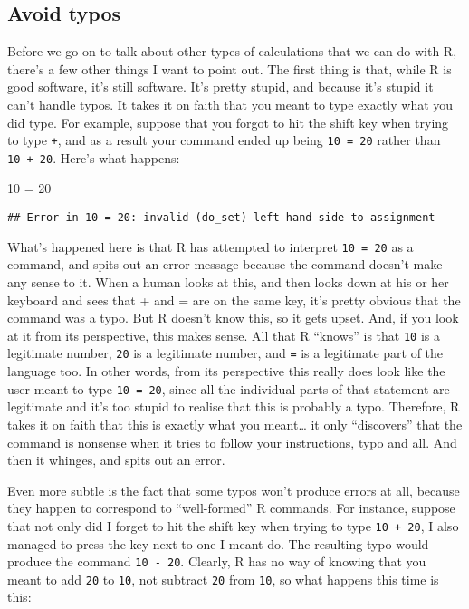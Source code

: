 \documentclass[]{book}
\newenvironment{Shaded}{\begin{snugshade}}{\end{snugshade}}
\newcommand{\DecValTok}[1]{\textcolor[rgb]{0.00,0.00,0.81}{#1}}
\newcommand{\NormalTok}[1]{#1}
\newcommand{\StringTok}[1]{\textcolor[rgb]{0.31,0.60,0.02}{#1}}
\begin{document}
\hypertarget{avoid-typos}{%
\subsection{Avoid typos}\label{avoid-typos}}

Before we go on to talk about other types of calculations that we can do with R, there's a few other things I want to point out. The first thing is that, while R is good software, it's still software. It's pretty stupid, and because it's stupid it can't handle typos. It takes it on faith that you meant to type exactly what you did type. For example, suppose that you forgot to hit the shift key when trying to type \texttt{+}, and as a result your command ended up being \texttt{10\ =\ 20} rather than \texttt{10\ +\ 20}. Here's what happens:

\begin{Shaded}
\begin{Highlighting}[]
\DecValTok{10}\NormalTok{ =}\StringTok{ }\DecValTok{20}
\end{Highlighting}
\end{Shaded}

\begin{verbatim}
## Error in 10 = 20: invalid (do_set) left-hand side to assignment
\end{verbatim}

What's happened here is that R has attempted to interpret \texttt{10\ =\ 20} as a command, and spits out an error message because the command doesn't make any sense to it. When a human looks at this, and then looks down at his or her keyboard and sees that + and = are on the same key, it's pretty obvious that the command was a typo. But R doesn't know this, so it gets upset. And, if you look at it from its perspective, this makes sense. All that R ``knows'' is that \texttt{10} is a legitimate number, \texttt{20} is a legitimate number, and \texttt{=} is a legitimate part of the language too. In other words, from its perspective this really does look like the user meant to type \texttt{10\ =\ 20}, since all the individual parts of that statement are legitimate and it's too stupid to realise that this is probably a typo. Therefore, R takes it on faith that this is exactly what you meant\ldots{} it only ``discovers'' that the command is nonsense when it tries to follow your instructions, typo and all. And then it whinges, and spits out an error.

Even more subtle is the fact that some typos won't produce errors at all, because they happen to correspond to ``well-formed'' R commands. For instance, suppose that not only did I forget to hit the shift key when trying to type \texttt{10\ +\ 20}, I also managed to press the key next to one I meant do. The resulting typo would produce the command \texttt{10\ -\ 20}. Clearly, R has no way of knowing that you meant to add \texttt{20} to \texttt{10}, not subtract \texttt{20} from \texttt{10}, so what happens this time is this:
\end{document}
